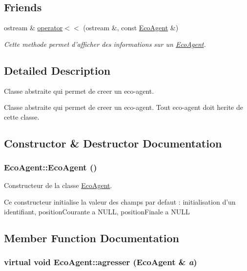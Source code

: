 \subsection*{Friends}
\begin{CompactItemize}
\item 
\hypertarget{classEcoAgent_fbb4d338d8cc27e755b4d5b2a8c52d68}{
ostream \& \hyperlink{classEcoAgent_fbb4d338d8cc27e755b4d5b2a8c52d68}{operator$<$$<$} (ostream \&, const \hyperlink{classEcoAgent}{EcoAgent} \&)}
\label{classEcoAgent_fbb4d338d8cc27e755b4d5b2a8c52d68}

\begin{CompactList}\small\item\em Cette methode permet d'afficher des informations sur un \hyperlink{classEcoAgent}{EcoAgent}. \item\end{CompactList}\end{CompactItemize}


\subsection{Detailed Description}
Classe abstraite qui permet de creer un eco-agent. 

Classe abstraite qui permet de creer un eco-agent. Tout eco-agent doit herite de cette classe. 

\subsection{Constructor \& Destructor Documentation}
\hypertarget{classEcoAgent_a0d07e98fbbb24b69a7d5d7fc0a75d2b}{
\subsubsection[{EcoAgent}]{\setlength{\rightskip}{0pt plus 5cm}EcoAgent::EcoAgent ()}}
\label{classEcoAgent_a0d07e98fbbb24b69a7d5d7fc0a75d2b}


Constructeur de la classe \hyperlink{classEcoAgent}{EcoAgent}. 

Ce constructeur initialise la valeur des champs par defaut : initialisation d'un identifiant, positionCourante a NULL, positionFinale a NULL 

\subsection{Member Function Documentation}
\hypertarget{classEcoAgent_867f0c274eb3ed0b61cb1fe7baa67edd}{
\subsubsection[{agresser}]{\setlength{\rightskip}{0pt plus 5cm}virtual void EcoAgent::agresser ({\bf EcoAgent} \& {\em a})}}
\label{classEcoAgent_867f0c274eb3ed0b61cb1fe7baa67edd}


